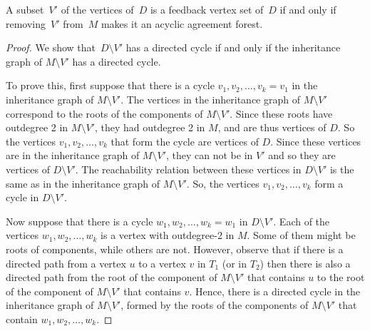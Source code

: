 \begin{lemma}\label{lem:dfvs}
A subset~$V'$ of the vertices of~$D$ is a feedback vertex set of~$D$ if and only if removing~$V'$ from~$M$ makes it an acyclic agreement forest.
\end{lemma}
\begin{proof}
We show that~$D\setminus V'$ has a directed cycle if and only if the inheritance graph of $M\setminus V'$ has a directed cycle.

To prove this, first suppose that there is a cycle $v_1,v_2,\ldots,v_k =
v_1$ in the inheritance graph of $M\setminus V'$. The vertices in the inheritance
graph of $M\setminus V'$ correspond to the roots of the components of $M\setminus V'$. Since these roots have outdegree 2 in $M\setminus V'$, they had outdegree 2 in $M$, and
are thus vertices of $D$. So the vertices $v_1,v_2,\ldots,v_k$ that form the
cycle are vertices of $D$. Since these vertices are in the inheritance
graph of $M\setminus V'$, they can not be in $V'$ and so they are vertices of $D\setminus V'$. The reachability relation between these vertices in $D\setminus V'$ is the same
as in the inheritance graph of $M\setminus V'$. So, the vertices $v_1,v_2,\ldots,v_k$
form a cycle in $D\setminus V'$.

Now suppose that there is a cycle $w_1,w_2,\ldots,w_k = w_1$ in $D\setminus V'$. Each
of the vertices $w_1, w_2,\ldots, w_k$ is a vertex with outdegree-2 in $M$.
Some of them might be roots of components, while others are not.
However, observe that if there is a directed path from a vertex $u$ to a
vertex $v$ in $T_1$ (or in $T_2$) then there is also a directed path from the root of
the component of $M\setminus V'$ that contains $u$ to the root of the component of
$M\setminus V'$ that contains $v$. Hence, there is a directed cycle in the
inheritance graph of $M\setminus V'$, formed by the roots of the components of
$M\setminus V'$ that contain $w_1,w_2,\ldots,w_k$.
\end{proof}


